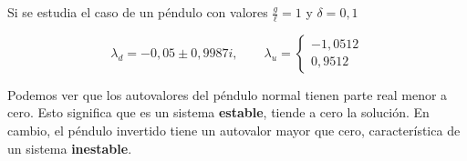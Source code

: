 \begin{exercise}
Si se estudia el caso de un péndulo con valores $\frac{g}{\ell}=1$ y $\delta = 0,1$

\[
\lambda_{d}=
-0,05 \pm 0,9987i
, \qquad \lambda_u = \begin{cases}
-1,0512 \\
0,9512
\end{cases}
\]

Podemos ver que los autovalores del péndulo normal tienen parte real menor a cero. Esto significa que es un sistema \textbf{estable}, tiende a cero la solución. En cambio, el péndulo invertido tiene un autovalor mayor que cero, característica de un sistema \textbf{inestable}.

\end{exercise}